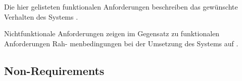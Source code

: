
Die hier gelisteten funktionalen Anforderungen beschreiben das gewünschte Verhalten des
Systems \cite[155]{goll2012methoden}.

Nichtfunktionale Anforderungen zeigen im Gegensatz zu funktionalen Anforderungen Rah-
menbedingungen bei der Umsetzung des Systems auf \cite[155]{goll2012methoden}.


\subsection{Non-Requirements}


